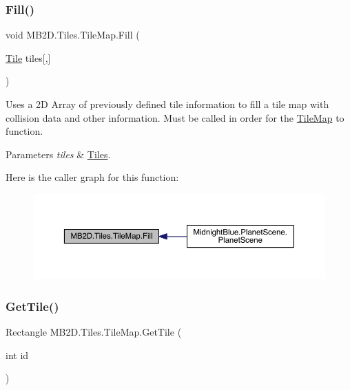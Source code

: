 \subsubsection{\texorpdfstring{Fill()}{Fill()}}
{\footnotesize\ttfamily void M\+B2\+D.\+Tiles.\+Tile\+Map.\+Fill (\begin{DoxyParamCaption}\item[{\hyperlink{class_m_b2_d_1_1_tile}{Tile}}]{tiles\mbox{[},\mbox{]} }\end{DoxyParamCaption})\hspace{0.3cm}{\ttfamily [inline]}}



Uses a 2D Array of previously defined tile information to fill a tile map with collision data and other information. Must be called in order for the \hyperlink{class_m_b2_d_1_1_tiles_1_1_tile_map}{Tile\+Map} to function. 


\begin{DoxyParams}{Parameters}
{\em tiles} & \hyperlink{namespace_m_b2_d_1_1_tiles}{Tiles}.\\
\hline
\end{DoxyParams}
Here is the caller graph for this function\+:
\nopagebreak
\begin{figure}[H]
\begin{center}
\leavevmode
\includegraphics[width=350pt]{class_m_b2_d_1_1_tiles_1_1_tile_map_acc786702f8dfb76227fcd76ce0b20510_icgraph}
\end{center}
\end{figure}
\hypertarget{class_m_b2_d_1_1_tiles_1_1_tile_map_a483549827f26a5282888728f20b56a8a}{}\label{class_m_b2_d_1_1_tiles_1_1_tile_map_a483549827f26a5282888728f20b56a8a} 
\subsubsection{\texorpdfstring{Get\+Tile()}{GetTile()}}
{\footnotesize\ttfamily Rectangle M\+B2\+D.\+Tiles.\+Tile\+Map.\+Get\+Tile (\begin{DoxyParamCaption}\item[{int}]{id }\end{DoxyParamCaption})\hspace{0.3cm}{\ttfamily [inline]}}




